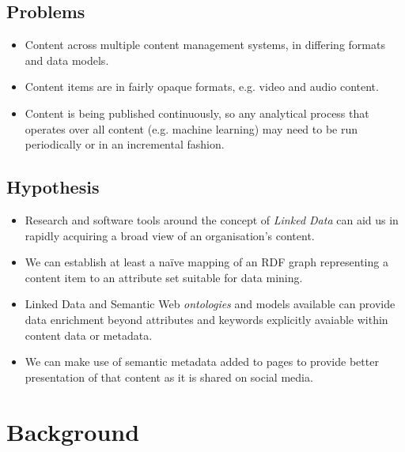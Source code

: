 \documentclass{sig-alternate-05-2015}
\begin{document}
\subsection{Problems}

\begin{itemize}

\item Content across multiple content management
systems, in differing formats and data models.

\item Content items are in fairly opaque formats, e.g. video and audio content.

\item Content is being published continuously, so any analytical process that operates
over all content (e.g. machine learning) may need to be run periodically or in
an incremental fashion.

\end{itemize}

\subsection{Hypothesis}

\begin{itemize}

\item Research and software tools around the concept of \emph{Linked Data} can
aid us in rapidly acquiring a broad view of an
organisation's content.

\item We can establish at least a na\"ive mapping of an RDF graph representing a
content item to an attribute set suitable for data mining.

\item Linked Data and Semantic Web \emph{ontologies} and models available can
provide data enrichment beyond attributes and keywords explicitly avaiable
within content data or metadata.

\item We can make use of semantic metadata added to pages
to provide better presentation of that content as it is shared on social media.

\end{itemize}

\section{Background}
\end{document}
